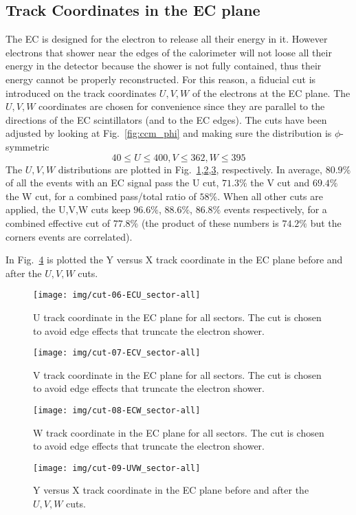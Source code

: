 \clearpage\newpage

\subsection{Track Coordinates in the EC plane}
\label{subsec:ecuvw}
The EC is designed for the electron to release all their energy in it.
However electrons that shower near the edges of the calorimeter will not loose
all their energy in the detector because the shower is not fully contained,
thus their energy cannot be properly reconstructed.
For this reason, a fiducial cut is introduced on the track coordinates $U,V,W$
of the electrons at the EC plane.
The $U,V,W$ coordinates are chosen for
convenience since they are parallel to the directions of the EC scintillators
(and to the EC edges).
The cuts have been adjusted by looking at Fig.~\ref{fig:ccm_phi}
and making sure the distribution is $\phi$-symmetric
\[
40\leq U\leq400, V\leq362, W\leq395
\]
The $U,V,W$ distributions are plotted in Fig.~\ref{fig:ECu},\ref{fig:ECv},\ref{fig:ECw},
respectively.
In average, $80.9\%$ of all the events with an EC signal pass the U cut, $71.3\%$ the V cut
and $69.4\%$ the W cut, for a combined pass/total ratio of $58\%$.
When all other cuts are applied, the U,V,W cuts keep $96.6\%$, $88.6\%$, $86.8\%$ events respectively,
for a combined effective cut of $77.8\%$ (the product of these numbers is  $74.2\%$ but the corners events are correlated).

In Fig.~\ref{fig:ECyx} is plotted the Y versus X track coordinate in the EC plane before and after
the $U,V,W$ cuts.



\clearpage
\begin{figure}[ht]
    \centering
    \texttt{[image: img/cut-06-ECU\_sector-all]}
    \caption{U track coordinate in the EC plane for all sectors. The cut is chosen to avoid
    edge effects that truncate the electron shower.}
    \label{fig:ECu}
\end{figure}
\clearpage

\clearpage
\begin{figure}[ht]
    \centering
    \texttt{[image: img/cut-07-ECV\_sector-all]}
    \caption{V track coordinate in the EC plane for all sectors. The cut is chosen to avoid
    edge effects that truncate the electron shower.}
    \label{fig:ECv}
\end{figure}

\clearpage
\begin{figure}[ht]
    \centering
    \texttt{[image: img/cut-08-ECW\_sector-all]}
    \caption{W track coordinate in the EC plane for all sectors. The cut is chosen to avoid
    edge effects that truncate the electron shower.}
    \label{fig:ECw}
\end{figure}

\begin{figure}[ht]
    \centering
    \texttt{[image: img/cut-09-UVW\_sector-all]}
    \caption{Y versus X track coordinate in the EC plane before and after
    the $U,V,W$ cuts.}
    \label{fig:ECyx}
\end{figure}

